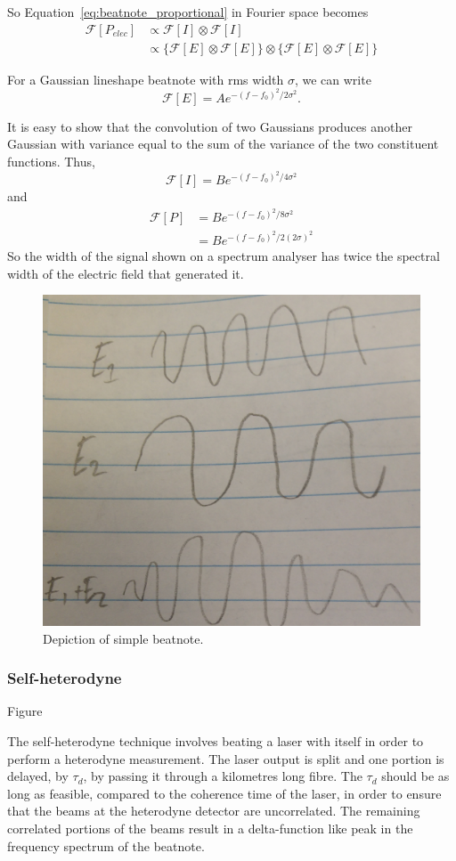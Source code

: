 So Equation~\ref{eq:beatnote_proportional} in Fourier space becomes
\begin{align}
\mathcal{F}[P_{elec}]&\propto \mathcal{F}[I]\otimes\mathcal{F}[I]\nonumber\\
&\propto \big\{\mathcal{F}[E] \otimes\mathcal{F}[E]\big\} \otimes\big\{\mathcal{F}[E] \otimes\mathcal{F}[E]\big\}
\end{align}

For a Gaussian lineshape beatnote with \gls{rms} width $\sigma$, we can write
\begin{equation}
\mathcal{F}[E] = A e^{-(f-f_0)^2/2\sigma^2}.
\end{equation}

It is easy to show that the convolution of two Gaussians produces another Gaussian with variance equal to the sum of the variance of the two constituent functions.
Thus,
\begin{equation}
\mathcal{F}[I] = B e^{-(f-f_0)^2/4\sigma^2}
\end{equation}
and
\begin{align}
\mathcal{F}[P] &= B e^{-(f-f_0)^2/8\sigma^2}\nonumber\\
&= B e^{-(f-f_0)^2/2(2\sigma)^2}
\end{align}
So the width of the signal shown on a spectrum analyser has twice the spectral width of the electric field that generated it.

\begin{figure}
\centering
\includegraphics[width=0.5\linewidth]{part1/Figs/beatnote.jpg}
\caption{Depiction of simple beatnote.}
\label{figure:simple_beatnote}
\end{figure}

\subsubsection{Self-heterodyne}
{\color{red}Figure}

The self-heterodyne technique involves beating a laser with itself in order to perform a heterodyne measurement\cite{okoshi_novel_1980, richter_linewidth_1986}.
The laser output is split and one portion is delayed, by $\tau_d$, by passing it through a kilometres long fibre.
The $\tau_d$ should be as long as feasible, compared to the coherence time of the laser, in order to ensure that the beams at the heterodyne detector are uncorrelated.
The remaining correlated portions of the beams result in a delta-function like peak in the frequency spectrum of the beatnote.

